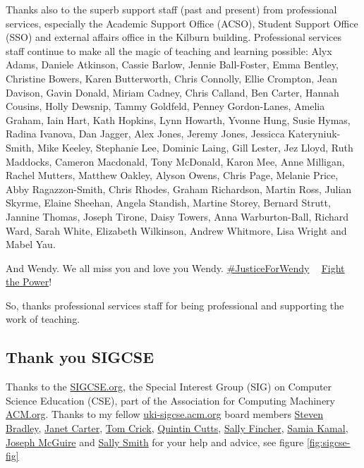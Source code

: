 \documentclass[
]{book}
\begin{document}
Thanks also to the superb support staff (past and present) from professional services, especially the Academic Support Office (ACSO), Student Support Office (SSO) and external affairs office in the Kilburn building. Professional services staff continue to make all the magic of teaching and learning possible: Alyx Adams, Daniele Atkinson, Cassie Barlow, Jennie Ball-Foster, Emma Bentley, Christine Bowers, Karen Butterworth, Chris Connolly, Ellie Crompton, Jean Davison, Gavin Donald, Miriam Cadney, Chris Calland, Ben Carter, Hannah Cousins, Holly Dewsnip, Tammy Goldfeld, Penney Gordon-Lanes, Amelia Graham, Iain Hart, Kath Hopkins, Lynn Howarth, Yvonne Hung, Susie Hymas, Radina Ivanova, Dan Jagger, Alex Jones, Jeremy Jones, Jessicca Kateryniuk-Smith, Mike Keeley, Stephanie Lee, Dominic Laing, Gill Lester, Jez Lloyd, Ruth Maddocks, Cameron Macdonald, Tony McDonald, Karon Mee, Anne Milligan, Rachel Mutters, Matthew Oakley, Alyson Owens, Chris Page, Melanie Price, Abby Ragazzon-Smith, Chris Rhodes, Graham Richardson, Martin Ross, Julian Skyrme, Elaine Sheehan, Angela Standish, Martine Storey, Bernard Strutt, Jannine Thomas, Joseph Tirone, Daisy Towers, Anna Warburton-Ball, Richard Ward, Sarah White, Elizabeth Wilkinson, Andrew Whitmore, Lisa Wright and Mabel Yau.

And Wendy. We all miss you and love you Wendy. \href{https://www.justgiving.com/crowdfunding/byte-cafe}{\#JusticeForWendy} ✊🏽 \href{https://en.wikipedia.org/wiki/Fight_the_Power_(Public_Enemy_song)}{Fight the Power}! ✊🏽 \citep{fightthepower}

So, thanks professional services staff for being professional and supporting the work of teaching. 🙏

\hypertarget{sigcse}{%
\subsection{Thank you SIGCSE}\label{sigcse}}

Thanks to the \href{https://www.sigcse.org}{SIGCSE.org}, the Special Interest Group (SIG) on Computer Science Education (CSE), part of the Association for Computing Machinery \href{https://www.acm.org/}{ACM.org}. Thanks to my fellow \href{https://uki-sigcse.acm.org/}{uki-sigcse.acm.org} board members \href{https://www.dur.ac.uk/research/directory/staff/?mode=staff\&id=106}{Steven Bradley}, \href{https://www.kent.ac.uk/computing/people/3101/carter-janet}{Janet Carter}, \href{https://proftomcrick.com/}{Tom Crick}, \href{https://www.gla.ac.uk/schools/computing/staff/quintincutts/}{Quintin Cutts}, \href{https://en.wikipedia.org/wiki/Sally_Fincher}{Sally Fincher}, \href{https://www.advance-he.ac.uk/ntfs/dr-samia-kamal}{Samia Kamal}, \href{https://www.gla.ac.uk/schools/computing/staff/josephmaguire/}{Joseph McGuire} and \href{https://www.napier.ac.uk/people/sally-smith}{Sally Smith} for your help and advice, see figure \ref{fig:sigcse-fig}
\end{document}
